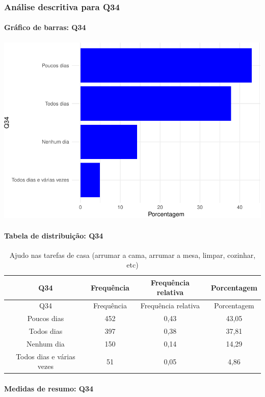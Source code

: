 \documentclass[]{article}
\let\oldparagraph\paragraph
\renewcommand{\paragraph}[1]{\oldparagraph{#1}\mbox{}}
\begin{document}
\hypertarget{anuxe1lise-descritiva-para-q34}{%
\subsubsection{Análise descritiva para Q34}\label{anuxe1lise-descritiva-para-q34}}

\hypertarget{gruxe1fico-de-barras-q34}{%
\paragraph{Gráfico de barras: Q34}\label{gruxe1fico-de-barras-q34}}

\begin{center}\includegraphics[width=0.75\linewidth]{relatorio_covid19_files/figure-latex/unnamed-chunk-1189-1} \end{center}

\hypertarget{tabela-de-distribuiuxe7uxe3o-q34}{%
\paragraph{Tabela de distribuição: Q34}\label{tabela-de-distribuiuxe7uxe3o-q34}}

\begin{longtable}[]{@{}cccc@{}}
\caption{\label{tab:unnamed-chunk-1190}Ajudo nas tarefas de casa (arrumar a cama, arrumar a mesa, limpar, cozinhar, etc)}\tabularnewline
\toprule
Q34 & Frequência & Frequência relativa & Porcentagem\tabularnewline
\midrule
\endfirsthead
\toprule
Q34 & Frequência & Frequência relativa & Porcentagem\tabularnewline
\midrule
\endhead
Poucos dias & 452 & 0,43 & 43,05\tabularnewline
Todos dias & 397 & 0,38 & 37,81\tabularnewline
Nenhum dia & 150 & 0,14 & 14,29\tabularnewline
Todos dias e várias vezes & 51 & 0,05 & 4,86\tabularnewline
\bottomrule
\end{longtable}

\hypertarget{medidas-de-resumo-q34}{%
\paragraph{Medidas de resumo: Q34}\label{medidas-de-resumo-q34}}
\end{document}
